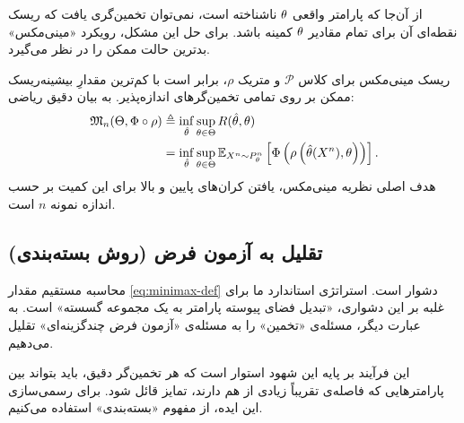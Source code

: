 از آن‌جا که پارامتر واقعی $\theta$ ناشناخته است، نمی‌توان تخمین‌گری یافت که ریسک نقطه‌ای آن برای تمام مقادیر $\theta$ کمینه باشد. برای حل این مشکل، رویکرد «مینی‌مکس» بدترین حالت ممکن را در نظر می‌گیرد.

\begin{تعریف}
\label{def:minimax-rate}
ریسک مینی‌مکس برای کلاس $\mathcal{P}$ و متریک $\rho$، برابر است با کم‌ترین مقدارِ بیشینه‌ریسک ممکن بر روی تمامی تخمین‌گرهای اندازه‌پذیر. به بیان دقیق ریاضی:
\begin{equation}
\label{eq:minimax-def}
\begin{split}
\mathfrak{M}_n(\Thh, \Phi \circ \rho) 
&\triangleq \inf_{\hat{\thh}} \sup_{\thh \in \Thh} R(\hat{\thh}, \thh) \\
&= \inf_{\hat{\thh}} \sup_{\thh \in \Thh} \Eset_{X^n \sim P_\thh^n} \left[ \Phi\left(\rho\left(\hat{\thh}(X^n), \thh\right)\right) \right].
\end{split}
\end{equation}
هدف اصلی نظریه مینی‌مکس، یافتن کران‌های پایین و بالا برای این کمیت بر حسب اندازه نمونه $n$ است.
\end{تعریف}

\subsection{تقلیل به آزمون فرض (روش بسته‌بندی)}
\label{sec:bg:hypothesis-testing}

محاسبه مستقیم مقدار \eqref{eq:minimax-def} دشوار است. استراتژی استاندارد ما برای غلبه بر این دشواری، «تبدیل فضای پیوسته پارامتر به یک مجموعه گسسته» است. به عبارت دیگر، مسئله‌ی «تخمین» را به مسئله‌ی «آزمون فرض چندگزینه‌ای» تقلیل می‌دهیم.

این فرآیند بر پایه این شهود استوار است که هر تخمین‌گر دقیق، باید بتواند بین پارامترهایی که فاصله‌ی تقریباً زیادی از هم دارند، تمایز قائل شود. برای رسمی‌سازی این ایده، از مفهوم «بسته‌بندی» استفاده می‌کنیم.

